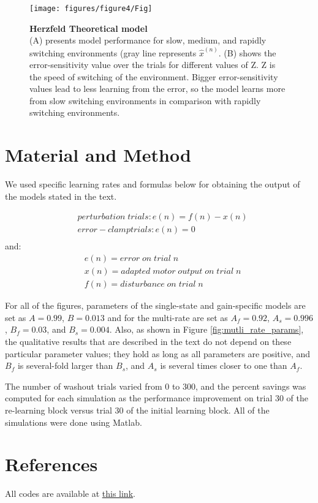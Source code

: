 \documentclass[9pt,twocolumn]{paper-template}
\begin{document}
\begin{figure}[h!]
  \centering
    \texttt{[image: figures/figure4/Fig]}
  \caption{\textbf{Herzfeld Theoretical model}\\
  {(A)} presents model performance for slow, medium, and rapidly switching environments (gray line represents $\hat{x}^{(n)}$. {(B)} shows the error-sensitivity value over the trials for different values of Z. Z is the speed of switching of the environment. Bigger error-sensitivity values lead to less learning from the error, so the model learns more from slow switching environments in comparison with rapidly switching environments.
}
  \label{fig:herzfeld}
\end{figure}





\section*{Material and Method}
We used specific learning rates and formulas below for obtaining the output of the models stated in the text.


\begin{eqnarray*}
& perturbation\;trials : e(n)=f(n)-x(n)\\
& error-clamp trials : e(n) = 0\\
\end{eqnarray*}
and:
\begin{eqnarray*}
& e(n) = error\;on\;trial\;n\\
& x(n) = adapted\;motor\;output\;on\;trial\;n\\
& f(n) = disturbance\;on\;trial\;n
\end{eqnarray*}

For all of the figures, parameters of the single-state and gain-specific models are set as $A=0.99$, $B=0.013$ and for the multi-rate are set as $A_f = 0.92$, $A_s = 0.996$, $B_f = 0.03$, and $B_s = 0.004$. Also, as shown in Figure \ref{fig:mutli_rate_params}, the qualitative results that are described in the text do not depend on these particular parameter values; they hold as long as all parameters are positive, and $B_f$ is several-fold larger than $B_s$, and $A_s$ is several times closer to one than $A_f$.

The number of washout trials varied from 0 to 300, and the percent savings was computed for each simulation as the performance improvement on trial 30 of the re-learning block versus trial 30 of the initial learning block. All of the simulations were done using Matlab.









\section*{References}


\bigskip
\begin{center}
All codes are available at \href{https://github.com/MohammadAminAlamalhoda/Motor-Learning}{this link}.
\end{center}
\end{document}
